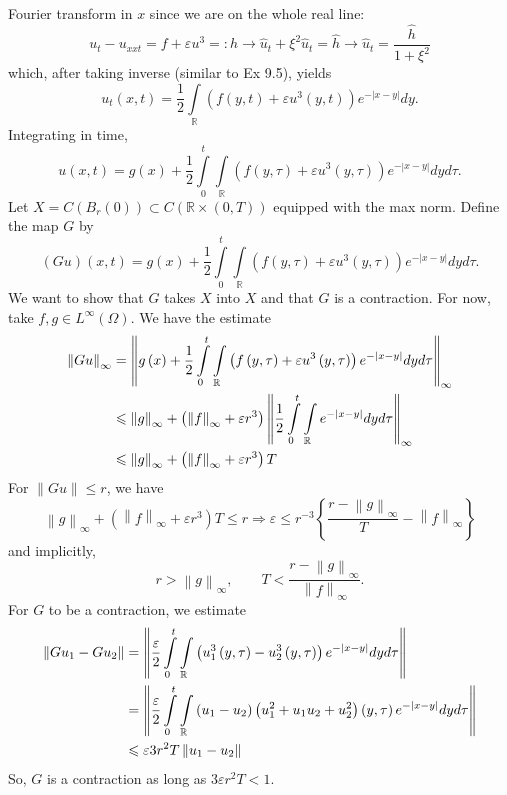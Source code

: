 \documentclass[letterpaper,twoside,11pt]{article}
\theoremstyle{mystyle}
\newcommand{\R}{{\mathbb R}}
\newcommand{\cblu}{\color{blue}}
\begin{document}
\cblu 
Fourier transform in $x$ since we are on the whole real line: 
\[{u_t} - {u_{xxt}} = f + \varepsilon {u^3} = :h \to {\hat u_t} + {\xi ^2}{\hat u_t} = \hat h \to {\hat u_t} = \frac{{\hat h}}{{1 + {\xi ^2}}}\] 
which, after taking inverse (similar to Ex 9.5), yields 
\[{u_t}\left( {x,t} \right) = \frac{1}{2}\int\limits_\mathbb{R} {\left( {f\left( {y,t} \right) + \varepsilon {u^3}\left( {y,t} \right)} \right){e^{ - \left| {x - y} \right|}}dy} .\]
Integrating in time, 
\[u\left( {x,t} \right) = g\left( x \right) + \frac{1}{2}\int\limits_0^t {\int\limits_\mathbb{R} {\left( {f\left( {y,\tau} \right) + \varepsilon {u^3}\left( {y,\tau} \right)} \right){e^{ - \left| {x - y} \right|}}dy} d\tau} .\]
Let $X = C(B_r(0))\subset C\left( \R\times  (0,T) \right)$ equipped with the max norm. Define the map \(G\) by 
\[\left( {Gu} \right)\left( {x,t} \right) = g\left( x \right) + \frac{1}{2}\int\limits_0^t {\int\limits_\mathbb{R} {\left( {f\left( {y,\tau } \right) + \varepsilon {u^3}\left( {y,\tau } \right)} \right){e^{ - \left| {x - y} \right|}}dy} d\tau } .\]
We want to show that $G$ takes $X$ into $X$ and that $G$ is a contraction. For now, take $f, g \in L^{\infty}(\Omega)$. We have the estimate 
\begin{align*}
    {\left\| {Gu} \right\|_\infty } &= {\left\| {g\left( x \right) + \frac{1}{2}\int\limits_0^t {\int\limits_\mathbb{R} {\left( {f\left( {y,\tau } \right) + \varepsilon {u^3}\left( {y,\tau } \right)} \right){e^{ - \left| {x - y} \right|}}dy} d\tau } } \right\|_\infty } \hfill \\
     &\leqslant {\left\| g \right\|_\infty } + \left( {{{\left\| f \right\|}_\infty } + \varepsilon {r^3}} \right){\left\| {\frac{1}{2}\int\limits_0^t {\int\limits_\mathbb{R} {{e^{ - \left| {x - y} \right|}}dy} d\tau } } \right\|_\infty } \hfill \\
     &\leqslant {\left\| g \right\|_\infty } + \left( {{{\left\| f \right\|}_\infty } + \varepsilon {r^3}} \right)T
\end{align*}
For $\|Gu\| \leq r$, we have 
\[{\left\| g \right\|_\infty } + \left( {{{\left\| f \right\|}_\infty } + \varepsilon {r^3}} \right)T \leqslant r \Rightarrow \varepsilon  \leqslant {r^{ - 3}}\left\{ {\frac{{r - {{\left\| g \right\|}_\infty }}}{T} - {{\left\| f \right\|}_\infty }} \right\}\]
and implicitly, 
\[r > {\left\| g \right\|_\infty },\qquad T < \frac{{r - {{\left\| g \right\|}_\infty }}}{{{{\left\| f \right\|}_\infty }}}.\]
For $G$ to be a contraction, we estimate 
\begin{align*}
    \left\| {G{u_1} - G{u_2}} \right\| &= \left\| {\frac{\varepsilon }{2}\int\limits_0^t {\int\limits_\mathbb{R} {\left( {u_1^3\left( {y,\tau } \right) - u_2^3\left( {y,\tau } \right)} \right){e^{ - \left| {x - y} \right|}}dy} d\tau } } \right\| \hfill \\
     &= \left\| {\frac{\varepsilon }{2}\int\limits_0^t {\int\limits_\mathbb{R} {\left( {{u_1} - {u_2}} \right)\left( {u_1^2 + {u_1}{u_2} + u_2^2} \right)\left( {y,\tau } \right){e^{ - \left| {x - y} \right|}}dy} d\tau } } \right\| \hfill \\
     &\leqslant \varepsilon 3{r^2}T\left\| {{u_1} - {u_2}} \right\|
\end{align*}
So, $G$ is a contraction as long as $3\varepsilon {r^2}T < 1$.
\end{document}
